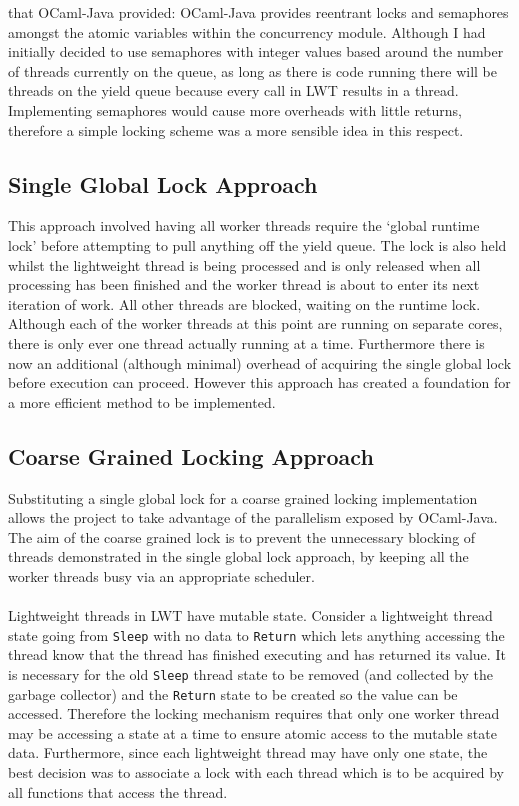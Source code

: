 \documentclass[12pt,twoside,notitlepage]{report}
\begin{document}
that OCaml-Java provided: OCaml-Java provides reentrant locks and semaphores amongst the atomic variables within the concurrency module. Although I had initially decided to use semaphores with integer values based around the
number of threads currently on the queue, as long as there is code running there will be threads on the yield queue because every call in LWT results in a thread. Implementing semaphores would cause more overheads with little
returns, therefore a simple locking scheme was a more sensible idea in this respect.

\subsection{Single Global Lock Approach}
\label{subsec:naive_runtime_lock_apprach}
%
%
This approach involved having all worker threads require the `global runtime lock' before attempting to pull anything off the yield queue. The lock is also held whilst the lightweight thread is being processed and is only released when all
processing has been finished and the worker thread is about to enter its next iteration of work. All other threads are blocked, waiting on the runtime lock. Although each of the worker threads at this point are running on separate
cores, there is only ever one thread actually running at a time. Furthermore there is now an additional (although minimal) overhead of acquiring the single global lock before execution can proceed. However this approach has created a
foundation for a more efficient method to be implemented.
%
%
\subsection{Coarse Grained Locking Approach}
\label{subsec:coarse_grained_locking_apprach}
%
%
Substituting a single global lock for a coarse grained locking implementation allows the project to take advantage of the parallelism exposed by OCaml-Java. The aim of the coarse grained lock is
to prevent the unnecessary blocking of threads demonstrated in the single global lock approach, by keeping all the worker threads busy via an appropriate scheduler.
\hfill\\
\hfill\\
%
%
Lightweight threads in LWT have mutable state. Consider a lightweight thread state going from {\tt Sleep} with no data to {\tt Return} which lets anything accessing the thread know that the thread has finished executing and has returned its value. It is necessary for
the old {\tt Sleep} thread state to be removed (and collected by the garbage collector) and the {\tt Return} state to be created so the value can be accessed. Therefore the locking mechanism requires that only one worker thread may be
accessing a state at a time to ensure atomic access to the mutable state data. Furthermore, since each lightweight thread may have only one state, the best decision was to associate a lock with each thread
which is to be acquired by all functions that access the thread. 
\end{document}
